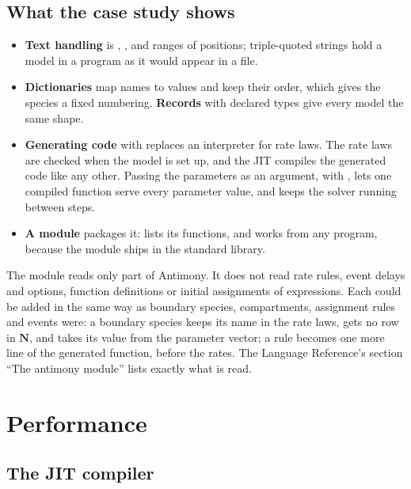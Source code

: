 \documentclass[11pt,a4paper,openany]{report}
\begin{document}
{{\section{What the case study shows}

\begin{itemize}
\item \textbf{Text handling} is , ,  and
  ranges of positions; triple-quoted strings hold a model in a program as it
  would appear in a file.
\item \textbf{Dictionaries} map names to values and keep their order, which
  gives the species a fixed numbering. \textbf{Records} with declared types
  give every model the same shape.
\item \textbf{Generating code} with  replaces an
  interpreter for rate laws. The rate laws are checked when the model is set
  up, and the JIT compiles the generated code like any other. Passing the
  parameters as an argument, with , lets one compiled function
  serve every parameter value, and  keeps the solver
  running between steps.
\item \textbf{A module} packages it:  lists its
  functions, and  works from any program, because the
  module ships in the standard library.
\end{itemize}

The module reads only part of Antimony. It does not read rate rules, event
delays and options, function definitions or initial assignments of
expressions. Each could be added in the same way as boundary species,
compartments, assignment rules and events were: a boundary species keeps its name in the rate laws,
gets no row in $\mathbf{N}$, and takes its value from the parameter vector; a rule
becomes one more line of the generated function, before the rates. The
Language Reference's section ``The antimony module'' lists exactly what is
read.

\chapter{Performance}\label{ch:perf}

\section{The JIT compiler}

}}
\end{document}
